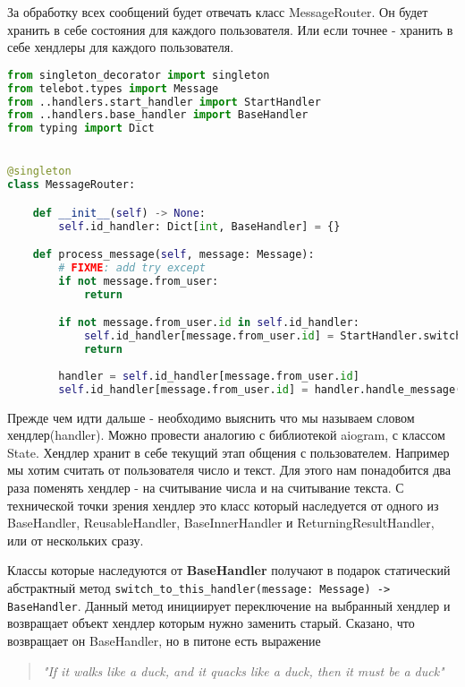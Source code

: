 \documentclass[12pt]{extarticle}
\begin{document}
За обработку всех сообщений будет отвечать класс MessageRouter. Он будет хранить в себе состояния для каждого пользователя. Или если точнее - хранить в себе хендлеры для каждого пользователя.

\begin{lstlisting}[language=Python,style=mystyle,caption=MessageRouter.py]
from singleton_decorator import singleton
from telebot.types import Message
from ..handlers.start_handler import StartHandler
from ..handlers.base_handler import BaseHandler
from typing import Dict


@singleton
class MessageRouter:

    def __init__(self) -> None:
        self.id_handler: Dict[int, BaseHandler] = {}

    def process_message(self, message: Message):
        # FIXME: add try except
        if not message.from_user:
            return

        if not message.from_user.id in self.id_handler:
            self.id_handler[message.from_user.id] = StartHandler.switch_to_this_handler(message)
            return
            
        handler = self.id_handler[message.from_user.id]
        self.id_handler[message.from_user.id] = handler.handle_message(message)
\end{lstlisting}

Прежде чем идти дальше - необходимо выяснить что мы называем словом хендлер(handler). Можно провести аналогию с библиотекой aiogram, с классом State. Хендлер хранит в себе текущий этап общения с пользователем. Например мы хотим считать от пользователя число и текст. Для этого нам понадобится два раза поменять хендлер - на считывание числа и на считывание текста. С технической точки зрения хендлер это класс который наследуется от одного из BaseHandler, ReusableHandler, BaseInnerHandler и ReturningResultHandler, или от нескольких сразу.

Классы которые наследуются от \textbf{BaseHandler} получают в подарок статический абстрактный метод \verb|switch_to_this_handler(message: Message) -> BaseHandler|. Данный метод инициирует переключение на выбранный хендлер и возвращает объект хендлер которым нужно заменить старый. Сказано, что возвращает он BaseHandler, но в питоне есть выражение 

\begin{quote}
    \textit{"If it walks like a duck, and it quacks like a duck, then it must be a duck"}
\end{quote}
\end{document}
